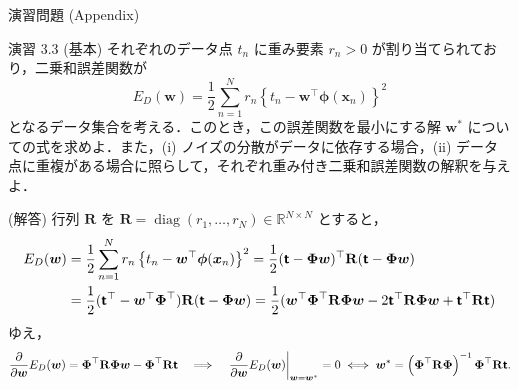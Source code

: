 \documentclass[uplatex,11pt,dvipdfmx,aspectratio=169,unicode,t]{beamer}
\numberwithin{equation}{section}
\newcommand{\BR}{\mathbb{R}}
\newcommand{\mb}[1]{\mathbf{#1}}
\newcommand{\tb}[1]{\textbf{#1}}
\newcommand{\ts}[1]{\textsf{#1}}
\newcommand{\bs}[1]{\boldsymbol{#1}}
\newcommand{\1}{\bs{1}}
\newcommand{\0}{\bs{0}}
\DeclareMathOperator*{\diag}{diag}
\begin{document}
\begin{frame}{演習問題 (Appendix)}
    \fontsize{7pt}{0cm}\selectfont
    \begin{block}{演習 3.3 (基本)}
        それぞれのデータ点 $t_{n}$ に重み要素 $r_{n} > 0$ が割り当てられており，二乗和誤差関数が
        \begin{equation}
            E_{D}(\bs{w}) = \frac{1}{2} \sum_{n=1}^{N} r_{n} \left\{t_{n} - \bs{w}^{\top} \bs{\phi}(\bs{x}_{n})\right\}^{2}
        \end{equation}
        となるデータ集合を考える．このとき，この誤差関数を最小にする解 $\bs{w}^{\ast}$ についての式を求めよ．また，(i) ノイズの分散がデータに依存する場合，(ii) データ点に重複がある場合に照らして，それぞれ重み付き二乗和誤差関数の解釈を与えよ．
    \end{block}
    (解答) 行列 $\mb{R}$ を $\mb{R} = \diag(r_{1},\ldots,r_{N}) \in \BR^{N \times N}$ とすると，
    \begin{align}
        E_{D}(\bs{w}) &= \frac{1}{2} \sum_{n=1}^{N} r_{n} \left\{t_{n} - \bs{w}^{\top} \bs{\phi}(\bs{x}_{n})\right\}^{2} = \frac{1}{2} (\tb{\ts{t}} - \bs{\Phi} \bs{w})^{\top} \mb{R} (\tb{\ts{t}} - \bs{\Phi} \bs{w}) \\
        &= \frac{1}{2} (\tb{\ts{t}}^{\top} - \bs{w}^{\top} \bs{\Phi}^{\top}) \mb{R} (\tb{\ts{t}} - \bs{\Phi} \bs{w}) = \frac{1}{2} (\bs{w}^{\top} \bs{\Phi}^{\top} \mb{R} \bs{\Phi} \bs{w} - 2 \tb{\ts{t}}^{\top} \mb{R} \bs{\Phi} \bs{w} + \tb{\ts{t}}^{\top} \mb{R} \tb{\ts{t}})
    \end{align}
    ゆえ，
    \begin{equation}
        \frac{\partial}{\partial{\bs{w}}} E_{D}(\bs{w}) = \bs{\Phi}^{\top} \mb{R} \bs{\Phi} \bs{w} - \bs{\Phi}^{\top} \mb{R} \tb{\ts{t}} \quad \Longrightarrow \quad \left.\frac{\partial}{\partial{\bs{w}}} E_{D}(\bs{w})\right|_{\bs{w} = \bs{w}^{\ast}} = 0 \iff \bs{w}^{\ast} = \left(\bs{\Phi}^{\top} \mb{R} \bs{\Phi}\right)^{-1} \bs{\Phi}^{\top} \mb{R} \tb{\ts{t}}.
    \end{equation}
\end{frame}
\end{document}
